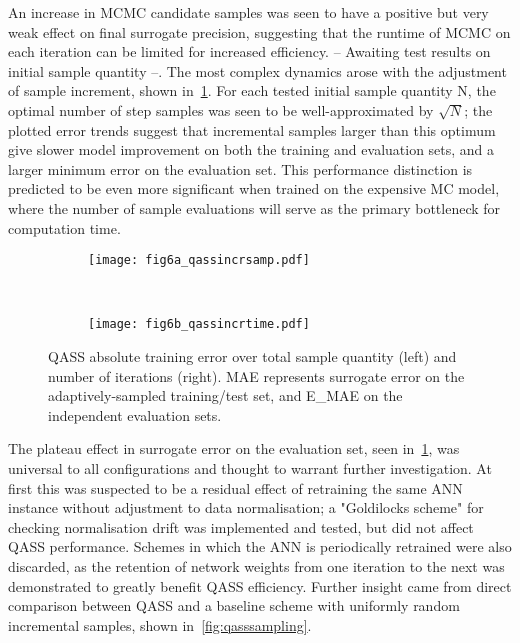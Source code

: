 An increase in MCMC candidate samples was seen to have a positive but very weak
effect on final surrogate precision, suggesting that the runtime of MCMC on each
iteration can be limited for increased efficiency. -- Awaiting test results on
initial sample quantity --. The most complex dynamics arose with the adjustment
of sample increment, shown in~\cref{fig:qassincr}. For each tested initial sample quantity N, the optimal number of step samples was seen to be well-approximated by $\sqrt{N}$; the plotted error trends suggest that incremental samples larger than this optimum give slower model improvement on both the training and evaluation sets, and a larger minimum error on the evaluation set. This performance distinction is predicted to be even more significant when trained on the expensive MC model, where the number of sample evaluations will serve as the primary bottleneck for computation time.
\begin{figure}[h!]
    \centering
    \begin{subfigure}[t]{0.5\textwidth}
        \centering
        \texttt{[image: fig6a\_qassincrsamp.pdf]}
    \end{subfigure}%
    ~ 
    \begin{subfigure}[t]{0.5\textwidth}
        \centering
        \texttt{[image: fig6b\_qassincrtime.pdf]}
    \end{subfigure}
    \caption{QASS absolute training error over total sample quantity (left) and number of iterations (right). MAE represents surrogate error on the adaptively-sampled training/test set, and E\_MAE on the independent evaluation sets.}
    \label{fig:qassincr}
\end{figure}

The plateau effect in surrogate error on the evaluation set, seen
in~\cref{fig:qassincr}, was universal to all configurations and thought to
warrant further investigation. At first this was suspected to be a residual
effect of retraining the same ANN instance without adjustment to data
normalisation; a "Goldilocks scheme" for checking normalisation drift was
implemented and tested, but did not affect QASS performance. Schemes in which
the ANN is periodically retrained were also discarded, as the retention of
network weights from one iteration to the next was demonstrated to greatly
benefit QASS efficiency. Further insight came from direct comparison between
QASS and a baseline scheme with uniformly random incremental samples, shown
in~\cref{fig:qasssampling}.

